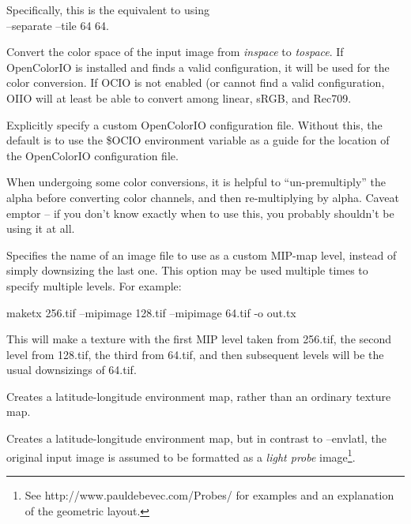 Specifically, this is the equivalent to using \\
 {\cf --separate --tile 64 64}.
\apiend

Convert the color space of the input image from \emph{inspace} to
\emph{tospace}.  If OpenColorIO is installed and finds a valid
configuration, it will be used for the color conversion.  If OCIO
is not enabled (or cannot find a valid configuration, OIIO will at
least be able to convert among linear, sRGB, and Rec709.
\apiend

Explicitly specify a custom OpenColorIO configuration file. Without this,
the default is to use the {\cf \$OCIO} environment variable as a guide for
the location of the OpenColorIO configuration file.
\apiend

When undergoing some color conversions, it is helpful to
``un-premultiply'' the alpha before converting color channels, and then
re-multiplying by alpha.  Caveat emptor -- if you don't know exactly
when to use this, you probably shouldn't be using it at all.
\apiend


Specifies the name of an image file to use as a custom MIP-map level, 
instead of simply downsizing the last one.  This option may be used
multiple times to specify multiple levels.  For example:
\begin{code}
    maketx 256.tif --mipimage 128.tif --mipimage 64.tif -o out.tx
\end{code}
This will make a texture with the first MIP level taken from {\cf 256.tif},
the second level from {\cf 128.tif}, the third from {\cf 64.tif}, and
then subsequent levels will be the usual downsizings of {\cf 64.tif}.
\apiend

Creates a latitude-longitude environment map, rather than an ordinary
texture map.
\apiend

Creates a latitude-longitude environment map, but in contrast to
{\cf --envlatl}, the original input image is assumed to be formatted
as a \emph{light probe} image\footnote{See
{\cf http://www.pauldebevec.com/Probes/} for examples and an explanation
of the geometric layout.}.
\apiend




